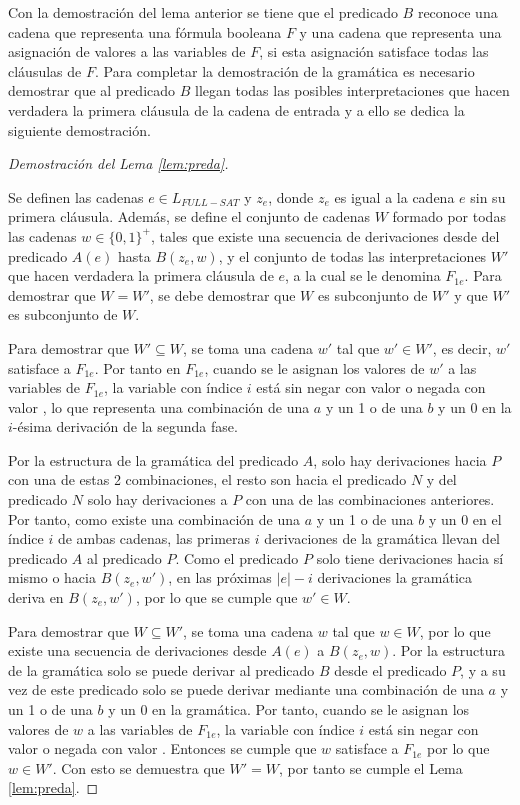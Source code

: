 Con la demostración del lema anterior se tiene que el predicado $B$ reconoce una cadena que representa una fórmula booleana $F$
y una cadena que representa una asignación de valores a las variables de $F$, si esta asignación satisface
todas las cláusulas de $F$. Para completar la demostración de la gramática es necesario demostrar
que al predicado $B$ llegan todas las posibles interpretaciones que hacen verdadera la primera cláusula
de la cadena de entrada y a ello se dedica la siguiente demostración.

\begin{proof}[Demostración del Lema \ref{lem:preda}] \
    
    Se definen las cadenas $e\in L_{FULL-SAT}$ y $z_e$, donde $z_e$ es igual a la cadena $e$ sin su primera cláusula.
    Además, se define el conjunto de cadenas $W$ formado por todas las cadenas $w\in \{0,1\}^+$, tales que existe una secuencia de derivaciones desde del predicado $A(e)$ hasta $B(z_e,w)$,
    y el conjunto de todas las interpretaciones $W'$ que hacen verdadera la primera cláusula de $e$, a la cual se le denomina $F_{1e}$.
    Para demostrar que $W=W'$, se debe demostrar que $W$ es subconjunto de $W'$ y que $W'$ es subconjunto de $W$.
    
    Para demostrar que $W'\subseteq W$, se toma una cadena $w'$ tal que $w'\in W'$, es decir, $w'$ satisface a $F_{1e}$.  Por tanto en $F_{1e}$, cuando se le asignan los valores de $w'$ a las variables de $F_{1e}$, la variable  con índice $i$ está sin negar con valor \true{} o negada con valor \false{}, lo que representa una combinación de una $a$ y un 1 o de una $b$ y un 0 en la $i$-ésima derivación de la segunda fase.
    
    Por la estructura de la gramática del predicado $A$, solo hay derivaciones hacia $P$ con una de estas 2 combinaciones, el resto son hacia el predicado $N$ y del predicado $N$ solo hay derivaciones a $P$ con una de las combinaciones anteriores. Por tanto, como existe una combinación de una $a$ y un 1 o de una $b$ y un 0 en el índice $i$ de ambas cadenas, las primeras $i$ derivaciones de la gramática llevan del predicado $A$ al predicado $P$. Como el predicado $P$ solo tiene derivaciones hacia sí mismo o hacia $B(z_e,w')$, en las próximas $|e|-i$ derivaciones la gramática deriva en $B(z_e,w')$, por lo que se cumple que $w'\in W$.
    
    Para demostrar que $W\subseteq W'$, se toma una cadena $w$ tal que $w\in W$, por lo que existe una secuencia de derivaciones desde $A(e)$ a $B(z_e,w)$. Por la estructura de la gramática solo se puede derivar al predicado $B$ desde el predicado $P$, y a su vez de este predicado solo se puede derivar mediante una combinación de una $a$ y un 1 o de una $b$ y un 0 en la gramática. Por tanto, cuando se le asignan los valores de $w$ a las variables de $F_{1e}$, la variable con índice $i$ está sin negar con valor \true{} o negada con valor \false{}.  Entonces se cumple que $w$ satisface a $F_{1e}$ por lo que $w\in W'$. Con esto se demuestra que $W'=W$, por tanto se cumple el Lema \ref{lem:preda}.
\end{proof}

